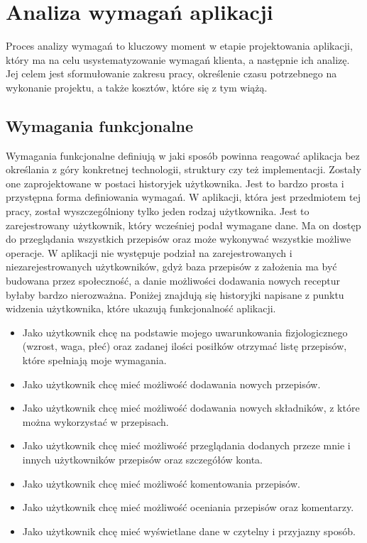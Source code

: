 \chapter{Analiza wymagań aplikacji}
Proces analizy wymagań to kluczowy moment w etapie projektowania aplikacji, który ma na celu usystematyzowanie wymagań klienta, a następnie ich analizę. Jej celem jest sformułowanie zakresu pracy, określenie czasu potrzebnego na wykonanie projektu, a także kosztów, które się z tym wiążą. 
\cite{analiza}

\section{Wymagania funkcjonalne}
Wymagania funkcjonalne definiują w jaki sposób powinna reagować aplikacja bez określania z góry konkretnej technologii, struktury czy też implementacji. Zostały one zaprojektowane w postaci historyjek użytkownika. Jest to bardzo prosta i przystępna forma definiowania wymagań.
\newline
W aplikacji, która jest przedmiotem tej pracy, został wyszczególniony tylko jeden rodzaj użytkownika. Jest to zarejestrowany użytkownik, który wcześniej podał wymagane dane. Ma on dostęp do przeglądania wszystkich przepisów oraz może wykonywać wszystkie możliwe operacje. W aplikacji nie występuje podział na zarejestrowanych i niezarejestrowanych użytkowników, gdyż baza przepisów z założenia ma być budowana przez społeczność, a danie możliwości dodawania nowych receptur byłaby bardzo nierozważna. 
\newline
Poniżej znajdują się historyjki napisane z punktu widzenia użytkownika, które ukazują funkcjonalność aplikacji.
\begin{itemize}
    \item Jako użytkownik chcę na podstawie mojego uwarunkowania fizjologicznego (wzrost, waga, płeć) oraz zadanej ilości posiłków otrzymać listę przepisów, które spełniają moje wymagania.
    \item Jako użytkownik chcę mieć możliwość dodawania nowych przepisów.
    \item Jako użytkownik chcę mieć możliwość dodawania nowych składników, z które można wykorzystać w przepisach.
    \item Jako użytkownik chcę mieć możliwość przeglądania dodanych przeze mnie i innych użytkowników przepisów oraz szczegółów konta.
    \item Jako użytkownik chcę mieć możliwość komentowania przepisów.
    \item Jako użytkownik chcę mieć możliwość oceniania przepisów oraz komentarzy.
    \item Jako użytkownik chcę mieć wyświetlane dane w czytelny i przyjazny sposób.
\end{itemize}


